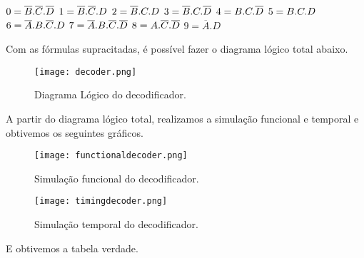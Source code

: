 \documentclass[12pt]{article}
\begin{document}
\begin{center}
	$ 0 = \overline{B}.\overline{C}.\overline{D}\\$
	$ 1 = \overline{B}.\overline{C}.D\\$
	$ 2 = \overline{B}.C.D\\$
	$ 3 = \overline{B}.C.\overline{D}\\$
	$ 4 = B.C.\overline{D}\\$
	$ 5 = B.C.D\\$
	$ 6 = \overline{A}.B.\overline{C}.D\\$
	$ 7 = \overline{A}.B.\overline{C}.\overline{D}\\$
	$ 8 = A.\overline{C}.\overline{D}\\$
	$ 9 = \overline{A}.D$
\end{center}	

Com as fórmulas supracitadas, é possível fazer o diagrama lógico total abaixo.

\begin{figure}[H]
	\centering
	\texttt{[image: decoder.png]}
	\caption{Diagrama Lógico do decodificador.}
	\label{fig:decoder}
\end{figure}

A partir do diagrama lógico total, realizamos a simulação funcional e temporal e obtivemos os seguintes gráficos.

\begin{figure}[H]
	\centering
	\texttt{[image: functionaldecoder.png]}
	\caption{Simulação funcional do decodificador.}
	\label{fig:funcdecoder}
\end{figure}

\begin{figure}[H]
	\centering
	\texttt{[image: timingdecoder.png]}
	\caption{Simulação temporal do decodificador.}
	\label{fig:timedecoder}
\end{figure}
 
 E obtivemos a tabela verdade.
 
\end{document}
